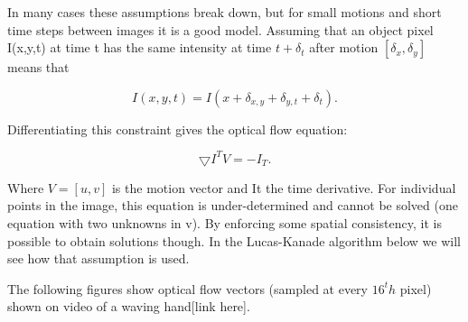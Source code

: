 \documentclass[12pt,fleqn]{book} %
\begin{document}
In many cases these assumptions break down, but for small motions and short time steps between images it is a good model. Assuming that an object pixel I(x,y,t) at time t has the same intensity at time $t+\delta_t$ after motion $[\delta_x, \delta_y]$ means that 
\begin{dBox}
\begin{equation}
I(x,y,t) =I(x + \delta_{x,y} + \delta_{y,t} + \delta_t).
\end{equation}
\end{dBox}

Differentiating this constraint gives the optical flow equation:

\begin{dBox}
\begin{equation}
\bigtriangledown I^T V = - I_T.
\end{equation}
\end{dBox}

Where $V = [u, v]$ is the motion vector and It the time derivative. For individual points in the image, this equation is under-determined and cannot be solved (one equation with two unknowns in v). By enforcing some spatial consistency, it is possible to obtain solutions though. In the Lucas-Kanade algorithm below we will see how that assumption is used.\bigskip

The following figures show optical flow vectors (sampled at every $16^th$ pixel) shown on video of a waving hand[link here]. 

\begin{figure}[h]
\begin{dBox}
\centering
  \mbox{
   }
   \caption{\label{fig:dynamic678} }   
\end{dBox}   
\end{figure}
\end{document}
